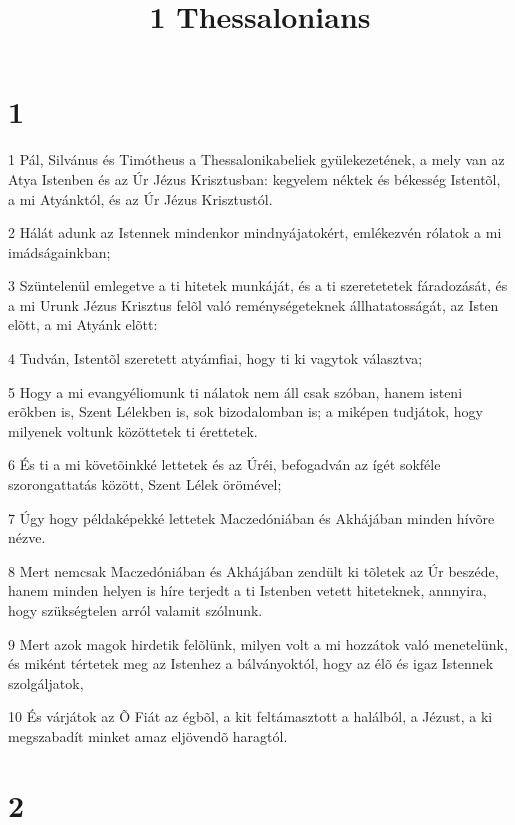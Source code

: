 

\title{1 Thessalonians}


\chapter{1}

\par 1 Pál, Silvánus és Timótheus a Thessalonikabeliek gyülekezetének, a mely van az Atya Istenben és az Úr Jézus Krisztusban: kegyelem néktek és békesség Istentõl, a mi Atyánktól, és az Úr Jézus Krisztustól.
\par 2 Hálát adunk az Istennek mindenkor mindnyájatokért, emlékezvén rólatok a mi imádságainkban;
\par 3 Szüntelenül emlegetve a ti hitetek munkáját, és a ti szeretetetek fáradozását, és a mi Urunk Jézus Krisztus felõl való reménységeteknek állhatatosságát, az Isten elõtt, a mi Atyánk elõtt:
\par 4 Tudván, Istentõl szeretett atyámfiai, hogy ti ki vagytok választva;
\par 5 Hogy a mi evangyéliomunk ti nálatok nem áll csak szóban, hanem isteni erõkben is, Szent Lélekben is, sok bizodalomban is; a miképen tudjátok, hogy milyenek voltunk közöttetek ti érettetek.
\par 6 És ti a mi követõinkké lettetek és az Úréi, befogadván az ígét sokféle szorongattatás között, Szent Lélek örömével;
\par 7 Úgy hogy példaképekké lettetek Maczedóniában és Akhájában minden hívõre nézve.
\par 8 Mert nemcsak Maczedóniában és Akhájában zendült ki tõletek az Úr beszéde, hanem minden helyen is híre terjedt a ti Istenben vetett hiteteknek, annnyira, hogy szükségtelen arról valamit szólnunk.
\par 9 Mert azok magok hirdetik felõlünk, milyen volt a mi hozzátok való menetelünk, és miként tértetek meg az Istenhez a bálványoktól, hogy az élõ és igaz Istennek szolgáljatok,
\par 10 És várjátok az Õ Fiát az égbõl, a kit feltámasztott a halálból, a Jézust, a ki megszabadít minket amaz eljövendõ haragtól.

\chapter{2}

